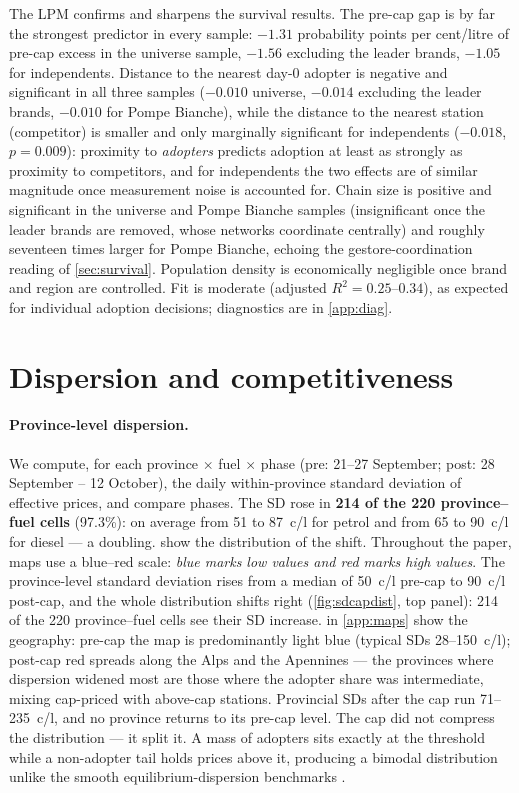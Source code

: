 \documentclass[11pt]{article}
\begin{document}
The LPM confirms and sharpens the survival results. The pre-cap gap is
by far the strongest predictor in every sample: $-1.31$ probability
points per cent/litre of pre-cap excess in the universe sample, $-1.56$
excluding the leader brands, $-1.05$ for independents. Distance to the
nearest day-0 adopter is negative and significant in all three samples
($-0.010$ universe, $-0.014$ excluding the leader brands, $-0.010$ for
Pompe Bianche), while the distance to the nearest station
(competitor) is smaller and only marginally significant for
independents ($-0.018$, $p = 0.009$): proximity to \emph{adopters}
predicts adoption at least as strongly as proximity to competitors,
and for independents the two effects are of similar magnitude once
measurement noise is accounted for. Chain size is positive and
significant in the universe and Pompe Bianche samples (insignificant
once the leader brands are removed, whose networks coordinate centrally)
and roughly seventeen times larger for Pompe Bianche, echoing the
gestore-coordination reading of \cref{sec:survival}. Population density
is economically negligible once brand and region are controlled. Fit is
moderate (adjusted $R^2 = 0.25$--$0.34$), as expected for individual
adoption decisions; diagnostics are in \cref{app:diag}.

\section{Dispersion and competitiveness}
\label{sec:dispersion}

\paragraph{Province-level dispersion.}
We compute, for each province $\times$ fuel $\times$ phase (pre:
21--27 September; post: 28 September -- 12 October), the daily
within-province standard deviation of effective prices, and compare
phases. The SD rose in \textbf{214 of the 220 province--fuel cells}
(97.3\%): on average from 51 to 87~c/l for petrol and from 65 to
90~c/l for diesel --- a doubling.  show the
distribution of the shift. Throughout the paper, maps use a blue--red
scale: \emph{blue marks low values and red marks high values}. The
province-level standard deviation rises from a median of 50~c/l
pre-cap to 90~c/l post-cap, and the whole distribution shifts right
(\cref{fig:sdcapdist}, top panel): 214 of the 220 province--fuel cells
see their SD increase.  in \cref{app:maps}
show the geography: pre-cap the map is predominantly light blue
(typical SDs 28--150~c/l); post-cap red spreads along the Alps and the
Apennines --- the provinces where dispersion widened most are those
where the adopter share was intermediate, mixing cap-priced with
above-cap stations. Provincial SDs after the cap run 71--235~c/l, and
no province returns to its pre-cap level. The cap did not compress the
distribution --- it split it. A mass of adopters sits exactly at the
threshold while a non-adopter tail holds prices above it, producing a
bimodal distribution unlike the smooth equilibrium-dispersion
benchmarks \parencite{reinganum1979, stiglitz1982}.
\end{document}
